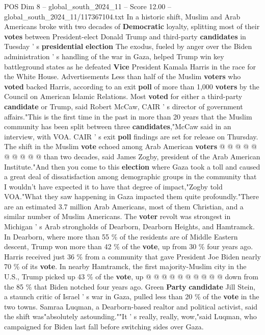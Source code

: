 \begin{textsample}{POS Dim 8 – global\_south\_2024\_11 – Score 12.00 – global\_south\_2024\_11/117367104.txt}  \label{ex:f8_pos_142}
In a historic shift, Muslim and Arab Americans broke with two decades of \textbf{Democratic} loyalty, splitting most of their \textbf{votes} between President-elect Donald Trump and third-party \textbf{candidates} in Tuesday ' s \textbf{presidential} \textbf{election} The exodus, fueled by anger over the Biden administration ' s handling of the war in Gaza, helped Trump win key battleground states as he defeated \textbf{Vice} President Kamala Harris in the race for the White House.
Advertisements Less than half of the Muslim \textbf{voters} who \textbf{voted} backed Harris, according to an exit \textbf{poll} of more than 1,000 \textbf{voters} by the Council on American Islamic Relations.
Most \textbf{voted} for either a third-party \textbf{candidate} or Trump, said Robert McCaw, CAIR ' s director of government affairs."This is the first time in the past in more than 20 years that the Muslim community has been split between three \textbf{candidates},"McCaw said in an interview, with VOA.
CAIR ' s exit \textbf{poll} findings are set for release on Thursday.
The shift in the Muslim \textbf{vote} echoed among Arab American \textbf{voters} @ @ @ @ @ @ @ @ @ @ than two decades, said James Zogby, president of the Arab American Institute."And then you come to this \textbf{election} where Gaza took a toll and caused a great deal of dissatisfaction among demographic groups in the community that I wouldn't have expected it to have that degree of impact,"Zogby told VOA."What they saw happening in Gaza impacted them quite profoundly."There are an estimated 3.7 million Arab Americans, most of them Christian, and a similar number of Muslim Americans.
The \textbf{voter} revolt was strongest in Michigan ' s Arab strongholds of Dearborn, Dearborn Heights, and Hamtramck.
In Dearborn, where more than 55 \% of the residents are of Middle Eastern descent, Trump won more than 42 \% of the \textbf{vote}, up from 30 \% four years ago.
Harris received just 36 \% from a community that gave President Joe Biden nearly 70 \% of its \textbf{vote}.
In nearby Hamtramck, the first majority-Muslim city in the U.S., Trump picked up 43 \% of the \textbf{vote}, up @ @ @ @ @ @ @ @ @ @ down from the 85 \% that Biden notched four years ago.
Green \textbf{Party} \textbf{candidate} Jill Stein, a staunch critic of Israel ' s war in Gaza, pulled less than 20 \% of the \textbf{vote} in the two towns.
Samraa Luqman, a Dearborn-based realtor and political activist, said the shift was"absolutely astounding.""It ' s really, really, wow,"said Luqman, who campaigned for Biden last fall before switching sides over Gaza.

\end{textsample}
